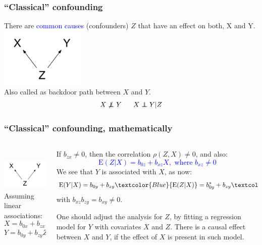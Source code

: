 \documentclass[10pt,dvipsnames,t,handout%
,aspectratio=169%
]{beamer}%
\newcommand{\E}{\mathrm{E}}
\newcommand{\indep}{\perp\!\!\!\!\perp}
\newcommand{\sini}[1]{\textcolor{Blue}{#1}}
\begin{document}
\begin{frame}
	\frametitle{``Classical'' confounding}
	There are  \sini{common causes} (confounders) $Z$ that have an effect on both, X and Y.  \\
	\includegraphics[width=4cm]{conf1}\\
	Also called as \alert{backdoor path} between $X$ and $Y$. \\
	
$$X \not\indep Y \; \hspace{0.5cm}  X \indep Y|Z$$
	
\end{frame}

\begin{frame}
	\frametitle{``Classical'' confounding, mathematically}
\begin{columns}
\begin{column}{5cm}
\mbox{ } \\
	\includegraphics[width=4cm]{conf1}
	\mbox{}\\[0.5cm]
Assuming linear associations:
$$ X = b_{0x} + b_{zx}Z  + \varepsilon_x, \ \E(\varepsilon_x|Z)=0 $$  
$$ Y = b_{0y} + b_{zy}Z + \varepsilon_y, \ \E(\varepsilon_y|Z, X)=0. $$
\end{column}
\begin{column}{7cm}
If $b_{zx} \ne 0$, then the correlation $\rho(Z,X)\ne 0$, and also: 
\sini{$$ \E(Z|X) =  b_{0z}+ b_{xz}X, \mbox{ where }b_{xz} \ne 0$$} 
We see that $Y$ is associated with $X$, as now:
$$\E(Y|X) =b_{0y} + b_{zy}\sini{\E(Z|X)} = b_{0y}^* + b_{zy}\sini{b_{xz}X}, $$
with $b_{xz}b_{zy} = b_{xy} \ne 0$.
\begin{block}{}\alert{One should adjust the analysis for $Z$, by fitting a regression model for $Y$ with covariates
	$X$  and $Z$.} 
There is a causal effect between $X$ and $Y$, if the effect of $X$ is present in such model. \end{block}
\end{column}
\end{columns}
\end{frame}
\end{document}
